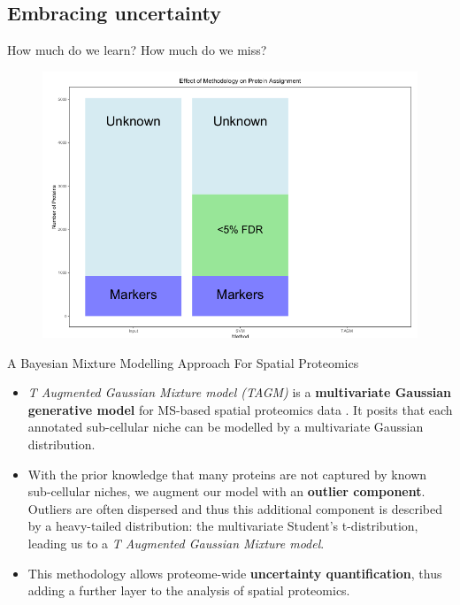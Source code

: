 \subsection{Embracing uncertainty}

\begin{frame}{How much do we learn? How much do we miss?}
  \begin{figure}
    \includegraphics[width=.8\linewidth]{./figs/preConcludePlot.png}
  \end{figure}
\end{frame}


\begin{frame}{A Bayesian Mixture Modelling Approach For Spatial Proteomics}

  \begin{itemize}

    \item<+-> \textit{T Augmented Gaussian Mixture model (TAGM)} is a
      \textbf{multivariate Gaussian generative model} for MS-based
      spatial proteomics data \citep{Crook:2018,Crook:2019}. It posits
      that each annotated sub-cellular niche can be modelled by a
      multivariate Gaussian distribution.

    \item<+-> With the prior knowledge that many proteins are not
      captured by known sub-cellular niches, we augment our model with
      an \textbf{outlier component}. Outliers are often dispersed and
      thus this additional component is described by a heavy-tailed
      distribution: the multivariate Student's t-distribution, leading
      us to a \textit{T Augmented Gaussian Mixture model}.

    \item<+-> This methodology allows proteome-wide
      \textbf{uncertainty quantification}, thus adding a further layer
      to the analysis of spatial proteomics.

  \end{itemize}
\end{frame}


